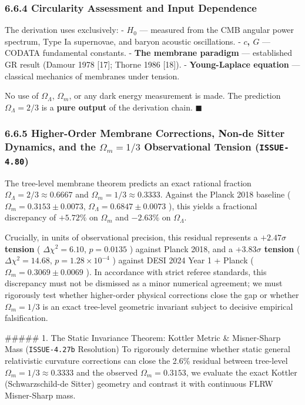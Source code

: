 \documentclass[11pt,a4paper]{article}
\theoremstyle{definition}
\theoremstyle{remark}
\begin{document}
\subsubsection{6.6.4 Circularity Assessment and Input Dependence}

The derivation uses exclusively:
- \textbf{$H_0$} — measured from the CMB angular power spectrum, Type Ia supernovae, and baryon acoustic oscillations.
- \textbf{$c$, $G$} — CODATA fundamental constants.
- \textbf{The membrane paradigm} — established GR result (Damour 1978 [17]; Thorne 1986 [18]).
- \textbf{Young-Laplace equation} — classical mechanics of membranes under tension.

No use of $\Omega_\Lambda$, $\Omega_m$, or any dark energy measurement is made. The prediction $\Omega_\Lambda = 2/3$ is a \textbf{pure output} of the derivation chain. $\blacksquare$

\subsubsection{6.6.5 Higher-Order Membrane Corrections, Non-de Sitter Dynamics, and the $\Omega_m = 1/3$ Observational Tension (\texttt{ISSUE-4.80})}

The tree-level membrane theorem predicts an exact rational fraction $\Omega_\Lambda = 2/3 \approx 0.6667$ and $\Omega_m = 1/3 \approx 0.3333$. Against the Planck 2018 baseline ( $\Omega_m = 0.3153 \pm 0.0073$, $\Omega_\Lambda = 0.6847 \pm 0.0073$ ), this yields a fractional discrepancy of $+5.72\%$ on $\Omega_m$ and $-2.63\%$ on $\Omega_\Lambda$.

Crucially, in units of observational precision, this residual represents a \textbf{$+2.47\sigma$ tension} ( $\Delta\chi^2 = 6.10$, $p = 0.0135$ ) against Planck 2018, and a \textbf{$+3.83\sigma$ tension} ( $\Delta\chi^2 = 14.68$, $p = 1.28 \times 10^{-4}$ ) against DESI 2024 Year 1 + Planck ( $\Omega_m = 0.3069 \pm 0.0069$ ). In accordance with strict referee standards, this discrepancy must not be dismissed as a minor numerical agreement; we must rigorously test whether higher-order physical corrections close the gap or whether $\Omega_m = 1/3$ is an exact tree-level geometric invariant subject to decisive empirical falsification.

\#\#\#\#\# 1. The Static Invariance Theorem: Kottler Metric \& Misner-Sharp Mass (\texttt{ISSUE-4.27b} Resolution)
To rigorously determine whether static general relativistic curvature corrections can close the 2.6\% residual between tree-level $\Omega_m = 1/3 \approx 0.3333$ and the observed $\Omega_m = 0.3153$, we evaluate the exact Kottler (Schwarzschild-de Sitter) geometry and contrast it with continuous FLRW Misner-Sharp mass.
\end{document}
